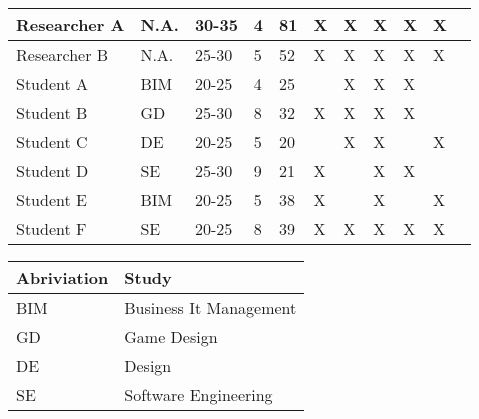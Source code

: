 \documentclass[conference]{IEEEtran}
\begin{document}
\begin{figure*}[ht]
\begin{enumerate}
\begin{enumerate}
\begin{figure*}[!ht]
\begin{tabular}{ | l | l | l | l | l | l | l | l | l | l | l }
			
			Researcher A	& N.A.			& 30-35 & 4		& 81	& X	& X	& X	& X	& X	\\ \hline
			Researcher B	& N.A.			& 25-30 & 5 	& 52	& X	& X	& X	& X	& X	\\ \hline
			Student A		& BIM			& 20-25 & 4 	& 25	& 	& X	& X	& X	& 	\\ \hline
			Student B		& GD 			& 25-30 & 8 	& 32	& X	& X	& X	& X	&	\\ \hline
			Student C		& DE			& 20-25 & 5		& 20	& 	& X	& X	&	& X	\\ \hline
			Student D		& SE 			& 25-30	& 9		& 21	& X	& 	& X	& X	&	\\ \hline
			Student E		& BIM		 	& 20-25	& 5 	& 38	& X	&	& X	&	& X	\\ \hline
			Student F		& SE 			& 20-25	& 8		& 39	& X	& X	& X	& X	& X	\\ \hline
			\end{tabular}
			\caption{General distribution of participants}
		\begin{tabular}{ | l | l | }
			\hline
			Abriviation & Study 					\\ \hline \hline
			BIM			& Business It Management	\\ \hline
			GD			& Game Design				\\ \hline
			DE			& Design					\\ \hline
			SE			& Software Engineering		\\ \hline
		
		\end{tabular}

\end{figure*}
\end{enumerate}
\end{enumerate}
\end{figure*}
\end{document}

